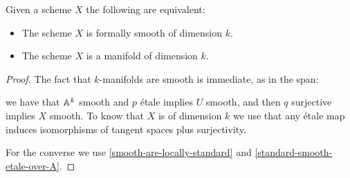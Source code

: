 \begin{proposition}
Given a scheme $X$ the following are equivalent:
\begin{itemize}
\item The scheme $X$ is formally smooth of dimension $k$.
\item The scheme $X$ is a manifold of dimension $k$.
\end{itemize}
\end{proposition}

\begin{proof}
The fact that $k$-manifolds are smooth is immediate, as in the span:
 \begin{center}
\end{center}
we have that $\mathbb{A}^k$ smooth and $p$ étale implies $U$ smooth, and then $q$ surjective implies $X$ smooth. To know that $X$ is of dimension $k$ we use that any étale map induces isomorphisms of tangent spaces plus surjectivity.

For the converse we use \cref{smooth-are-locally-standard} and \cref{standard-smooth-etale-over-A}.
\end{proof}

